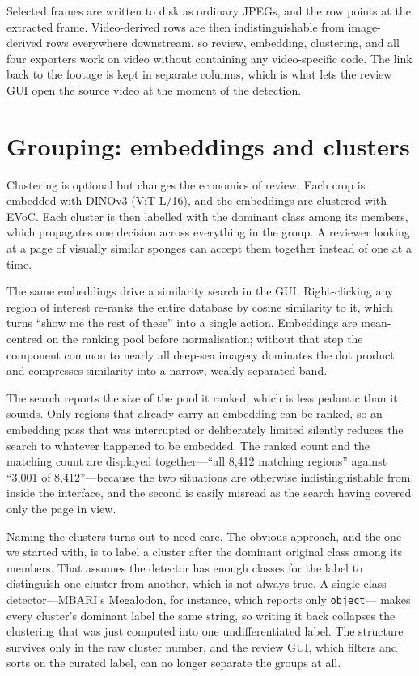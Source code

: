 \documentclass[10pt,letterpaper]{article}
\newcommand{\code}[1]{\texttt{\small #1}}
\begin{document}
Selected frames are written to disk as ordinary JPEGs, and the row points at the
extracted frame. Video-derived rows are then indistinguishable from
image-derived rows everywhere downstream, so review, embedding, clustering, and
all four exporters work on video without containing any video-specific code. The
link back to the footage is kept in separate columns, which is what lets the
review GUI open the source video at the moment of the detection.

\section{Grouping: embeddings and clusters}

Clustering is optional but changes the economics of review. Each crop is
embedded with DINOv3 (ViT-L/16), and the embeddings are clustered with EVoC.
Each cluster is then labelled with the dominant class among its members, which
propagates one decision across everything in the group. A reviewer looking at a
page of visually similar sponges can accept them together instead of one at a
time.

The same embeddings drive a similarity search in the GUI. Right-clicking any
region of interest re-ranks the entire database by cosine similarity to it,
which turns ``show me the rest of these'' into a single action. Embeddings are
mean-centred on the ranking pool before normalisation; without that step the
component common to nearly all deep-sea imagery dominates the dot product and
compresses similarity into a narrow, weakly separated band.

The search reports the size of the pool it ranked, which is less pedantic than
it sounds. Only regions that already carry an embedding can be ranked, so an
embedding pass that was interrupted or deliberately limited silently reduces
the search to whatever happened to be embedded. The ranked count and the
matching count are displayed together---``all 8,412 matching regions'' against
``3,001 of 8,412''---because the two situations are otherwise indistinguishable
from inside the interface, and the second is easily misread as the search
having covered only the page in view.

Naming the clusters turns out to need care. The obvious approach, and the one
we started with, is to label a cluster after the dominant original class among
its members. That assumes the detector has enough classes for the label to
distinguish one cluster from another, which is not always true. A single-class
detector---MBARI's Megalodon, for instance, which reports only \code{object}---
makes every cluster's dominant label the same string, so writing it back
collapses the clustering that was just computed into one undifferentiated
label. The structure survives only in the raw cluster number, and the review
GUI, which filters and sorts on the curated label, can no longer separate the
groups at all.
\end{document}
